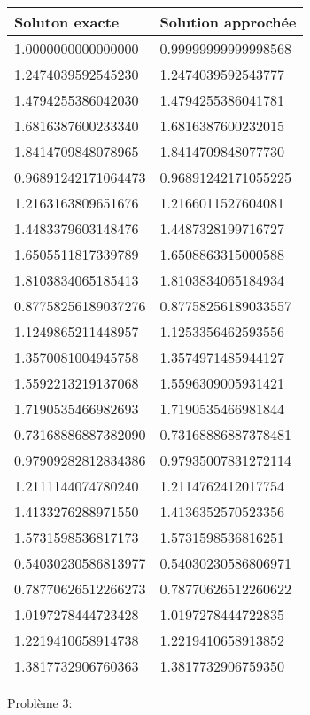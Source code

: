 \documentclass[a4paper,12pt,twoside]{report}
\begin{document}
\begin{tabular}{|l|l|}
\hline
Soluton exacte & Solution approchée\\
  \hline
 	1.0000000000000000& 0.99999999999998568  \\
   	1.2474039592545230 &1.2474039592543777\\
1.4794255386042030& 1.4794255386041781 \\
1.6816387600233340&1.6816387600232015  \\
	1.8414709848078965&1.8414709848077730 \\ 				
	0.96891242171064473& 0.96891242171055225 \\
  1.2163163809651676 & 1.2166011527604081 \\  
	1.4483379603148476& 1.4487328199716727  \\
	1.6505511817339789 & 1.6508863315000588   \\
	1.8103834065185413& 1.8103834065184934   \\
         0.87758256189037276& 0.87758256189033557   \\   
1.1249865211448957& 1.1253356462593556  \\
	1.3570081004945758& 1.3574971485944127  \\
	1.5592213219137068 & 1.5596309005931421   \\
 1.7190535466982693& 1.7190535466981844\\  
0.73168886887382090&  0.73168886887378481 \\
0.97909282812834386& 0.97935007831272114   \\
 	1.2111144074780240& 1.2114762412017754\\
      1.4133276288971550& 1.4136352570523356\\   
 	1.5731598536817173 & 1.5731598536816251 \\
   	0.54030230586813977& 0.54030230586806971 \\
	0.78770626512266273& 0.78770626512260622\\ 
       1.0197278444723428 & 1.0197278444722835  \\   
 	1.2219410658914738& 1.2219410658913852 \\
	1.3817732906760363& 1.3817732906759350\\
  
  \hline
\end{tabular}

\clearpage
Problème 3:
\end{document}
